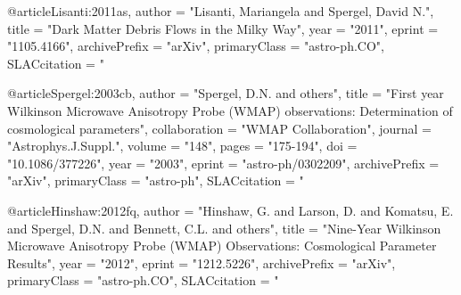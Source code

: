 @article{Lisanti:2011as,
    author         = "Lisanti, Mariangela and Spergel, David N.",
    title          = "{Dark Matter Debris Flows in the Milky Way}",
    year           = "2011",
    eprint         = "1105.4166",
    archivePrefix  = "arXiv",
    primaryClass   = "astro-ph.CO",
    SLACcitation   = "%
}

@article{Spergel:2003cb,
    author         = "Spergel, D.N. and others",
    title          = "{First year Wilkinson Microwave Anisotropy Probe (WMAP)
    observations: Determination of cosmological parameters}",
    collaboration  = "WMAP Collaboration",
    journal        = "Astrophys.J.Suppl.",
    volume         = "148",
    pages          = "175-194",
    doi            = "10.1086/377226",
    year           = "2003",
    eprint         = "astro-ph/0302209",
    archivePrefix  = "arXiv",
    primaryClass   = "astro-ph",
    SLACcitation   = "%
}

@article{Hinshaw:2012fq,
    author         = "Hinshaw, G. and Larson, D. and Komatsu, E. and Spergel,
    D.N. and Bennett, C.L. and others",
    title          = "{Nine-Year Wilkinson Microwave Anisotropy Probe (WMAP)
    Observations: Cosmological Parameter Results}",
    year           = "2012",
    eprint         = "1212.5226",
    archivePrefix  = "arXiv",
    primaryClass   = "astro-ph.CO",
    SLACcitation   = "%
}
